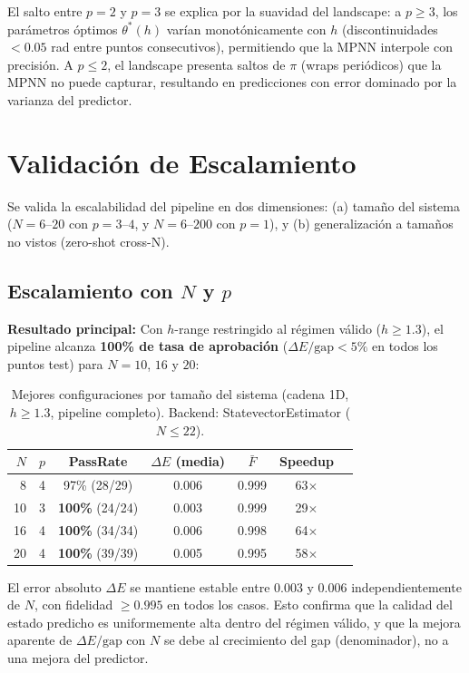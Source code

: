 \documentclass[11pt,a4paper,spanish]{book}
\begin{document}
\noindent El salto entre $p=2$ y $p=3$ se explica por la suavidad del landscape: a $p \geq 3$, los parámetros óptimos $\theta^*(h)$ varían monotónicamente con $h$ (discontinuidades $< 0.05$ rad entre puntos consecutivos), permitiendo que la MPNN interpole con precisión. A $p \leq 2$, el landscape presenta saltos de $\pi$ (wraps periódicos) que la MPNN no puede capturar, resultando en predicciones con error dominado por la varianza del predictor.

\section{Validación de Escalamiento}

Se valida la escalabilidad del pipeline en dos dimensiones: (a) tamaño del sistema ($N = 6$--$20$ con $p = 3$--$4$, y $N = 6$--$200$ con $p = 1$), y (b) generalización a tamaños no vistos (zero-shot cross-N).

\subsection{Escalamiento con $N$ y $p$}

\textbf{Resultado principal:} Con $h$-range restringido al régimen válido ($h \geq 1.3$), el pipeline alcanza \textbf{100\% de tasa de aprobación} ($\Delta E/\text{gap} < 5\%$ en todos los puntos test) para $N = 10$, $16$ y $20$:

\begin{table}[h]
\centering
\caption{Mejores configuraciones por tamaño del sistema (cadena 1D, $h \geq 1.3$, pipeline completo). Backend: StatevectorEstimator ($N \leq 22$).}
\label{tab:scaling}
\begin{tabular}{rcccccc}
\toprule
\textbf{$N$} & \textbf{$p$} & \textbf{PassRate} & \textbf{$\Delta E$ (media)} & \textbf{$\bar{F}$} & \textbf{Speedup} \\
\midrule
8 & 4 & 97\% (28/29) & 0.006 & 0.999 & 63$\times$ \\
10 & 3 & \textbf{100\%} (24/24) & 0.003 & 0.999 & 29$\times$ \\
16 & 4 & \textbf{100\%} (34/34) & 0.006 & 0.998 & 64$\times$ \\
20 & 4 & \textbf{100\%} (39/39) & 0.005 & 0.995 & 58$\times$ \\
\bottomrule
\end{tabular}
\end{table}

El error absoluto $\Delta E$ se mantiene estable entre 0.003 y 0.006 independientemente de $N$, con fidelidad $\geq 0.995$ en todos los casos. Esto confirma que la calidad del estado predicho es uniformemente alta dentro del régimen válido, y que la mejora aparente de $\Delta E/\text{gap}$ con $N$ se debe al crecimiento del gap (denominador), no a una mejora del predictor.
\end{document}
